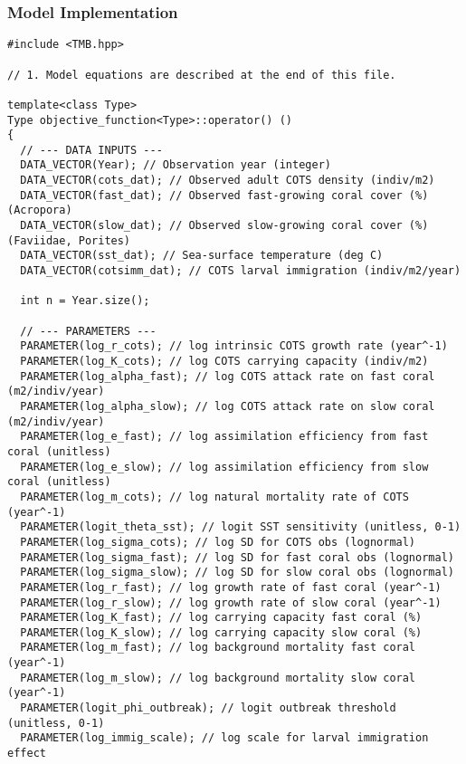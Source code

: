 \subsubsection{Model Implementation}
\begin{lstlisting}
#include <TMB.hpp>

// 1. Model equations are described at the end of this file.

template<class Type>
Type objective_function<Type>::operator() ()
{
  // --- DATA INPUTS ---
  DATA_VECTOR(Year); // Observation year (integer)
  DATA_VECTOR(cots_dat); // Observed adult COTS density (indiv/m2)
  DATA_VECTOR(fast_dat); // Observed fast-growing coral cover (%) (Acropora)
  DATA_VECTOR(slow_dat); // Observed slow-growing coral cover (%) (Faviidae, Porites)
  DATA_VECTOR(sst_dat); // Sea-surface temperature (deg C)
  DATA_VECTOR(cotsimm_dat); // COTS larval immigration (indiv/m2/year)

  int n = Year.size();

  // --- PARAMETERS ---
  PARAMETER(log_r_cots); // log intrinsic COTS growth rate (year^-1)
  PARAMETER(log_K_cots); // log COTS carrying capacity (indiv/m2)
  PARAMETER(log_alpha_fast); // log COTS attack rate on fast coral (m2/indiv/year)
  PARAMETER(log_alpha_slow); // log COTS attack rate on slow coral (m2/indiv/year)
  PARAMETER(log_e_fast); // log assimilation efficiency from fast coral (unitless)
  PARAMETER(log_e_slow); // log assimilation efficiency from slow coral (unitless)
  PARAMETER(log_m_cots); // log natural mortality rate of COTS (year^-1)
  PARAMETER(logit_theta_sst); // logit SST sensitivity (unitless, 0-1)
  PARAMETER(log_sigma_cots); // log SD for COTS obs (lognormal)
  PARAMETER(log_sigma_fast); // log SD for fast coral obs (lognormal)
  PARAMETER(log_sigma_slow); // log SD for slow coral obs (lognormal)
  PARAMETER(log_r_fast); // log growth rate of fast coral (year^-1)
  PARAMETER(log_r_slow); // log growth rate of slow coral (year^-1)
  PARAMETER(log_K_fast); // log carrying capacity fast coral (%)
  PARAMETER(log_K_slow); // log carrying capacity slow coral (%)
  PARAMETER(log_m_fast); // log background mortality fast coral (year^-1)
  PARAMETER(log_m_slow); // log background mortality slow coral (year^-1)
  PARAMETER(logit_phi_outbreak); // logit outbreak threshold (unitless, 0-1)
  PARAMETER(log_immig_scale); // log scale for larval immigration effect


\end{lstlisting}
